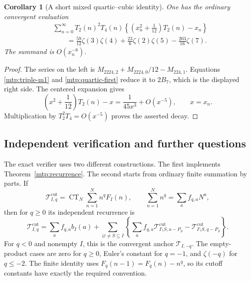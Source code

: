 \documentclass[11pt,letterpaper]{article}
\numberwithin{equation}{section}
\newtheorem{corollary}[theorem]{Corollary}
\theoremstyle{definition}
\theoremstyle{remark}
\begin{document}
\begin{corollary}[A short mixed quartic--cubic identity]
\label{mtp:short-quartic}
One has the ordinary convergent evaluation
\begin{equation}\label{mtp:short-quartic-formula}
 \boxed{\begin{aligned}
 &\sum_{n=0}^{\infty}T_2(n)^2T_4(n)
       \left\{\left(x_n^2+\frac1{12}\right)T_2(n)-x_n\right\}\\
 &\qquad=\frac{59}{12}\zeta(3)\zeta(4)
                +\frac{23}{6}\zeta(2)\zeta(5)-\frac{203}{16}\zeta(7).
 \end{aligned}}
\end{equation}
The summand is $O(x_n^{-8})$.
\end{corollary}

\begin{proof}
The series on the left is
$M_{2224,2}+M_{2224,0}/12-M_{224,1}$. Equations
\eqref{mtp:triple-m1} and \eqref{mtp:quartic-first} reduce it to $2B_7$,
which is the displayed right side. The centered expansion gives
\[
 \left(x^2+\frac1{12}\right)T_2(n)-x
       =\frac1{45x^3}+O(x^{-5}),\qquad x=x_n.
\]
Multiplication by $T_2^2T_4=O(x^{-5})$ proves the asserted decay.
\end{proof}

\subsection{Independent verification and further questions}

The exact verifier uses two different constructions. The first
implements Theorem~\ref{mtp:recurrence}. The second starts from
ordinary finite summation by parts. If
\[
 \mathcal T_{I,q}^{\mathrm{cut}}
  =\operatorname{CT}_N\sum_{n=1}^Nn^qF_I(n),\qquad
       \sum_{n=1}^Nn^q=\sum_a f_{q,a}N^a,
\]
then for $q\ge0$ its independent recurrence is
\begin{equation}\label{mtp:independent-cutoff}
 \mathcal T_{I,q}^{\mathrm{cut}}
   =\sum_a f_{q,a}b_I(a)
    +\sum_{\varnothing\ne S\subseteq I}
       \left\{\sum_a f_{q,a}
                    \mathcal T_{I\setminus S,a-P_S}^{\mathrm{cut}}
                    -\mathcal T_{I\setminus S,q-P_S}^{\mathrm{cut}}\right\}.
\end{equation}
For $q<0$ and nonempty $I$, this is the convergent anchor
$\mathcal T_{I,-q}$. The empty-product cases are zero for $q\ge0$,
Euler's constant for $q=-1$, and $\zeta(-q)$ for $q\le-2$.
The finite identity uses $F_q(n-1)=F_q(n)-n^q$, so its cutoff constants
have exactly the required convention.
\end{document}
